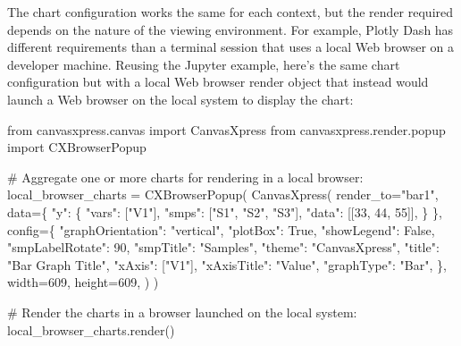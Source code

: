 \documentclass[
  letterpaper,
  DIV=11,
  numbers=noendperiod]{scrartcl}
\newenvironment{Shaded}{\begin{snugshade}}{\end{snugshade}}
\newcommand{\CommentTok}[1]{\textcolor[rgb]{0.37,0.37,0.37}{#1}}
\newcommand{\DecValTok}[1]{\textcolor[rgb]{0.68,0.00,0.00}{#1}}
\newcommand{\ImportTok}[1]{\textcolor[rgb]{0.00,0.46,0.62}{#1}}
\newcommand{\NormalTok}[1]{\textcolor[rgb]{0.00,0.23,0.31}{#1}}
\newcommand{\OperatorTok}[1]{\textcolor[rgb]{0.37,0.37,0.37}{#1}}
\newcommand{\StringTok}[1]{\textcolor[rgb]{0.13,0.47,0.30}{#1}}
\newcommand{\VariableTok}[1]{\textcolor[rgb]{0.07,0.07,0.07}{#1}}
\begin{document}
The chart configuration works the same for each context, but the render
required depends on the nature of the viewing environment. For example,
Plotly Dash has different requirements than a terminal session that uses
a local Web browser on a developer machine. Reusing the Jupyter example,
here's the same chart configuration but with a local Web browser render
object that instead would launch a Web browser on the local system to
display the chart:

\begin{Shaded}
\begin{Highlighting}[]
\ImportTok{from}\NormalTok{ canvasxpress.canvas }\ImportTok{import}\NormalTok{ CanvasXpress}
\ImportTok{from}\NormalTok{ canvasxpress.render.popup }\ImportTok{import}\NormalTok{ CXBrowserPopup}

\CommentTok{\# Aggregate one or more charts for rendering in a local browser:}
\NormalTok{local\_browser\_charts }\OperatorTok{=}\NormalTok{ CXBrowserPopup(}
\NormalTok{    CanvasXpress(}
\NormalTok{        render\_to}\OperatorTok{=}\StringTok{"bar1"}\NormalTok{,}
\NormalTok{        data}\OperatorTok{=}\NormalTok{\{}
            \StringTok{"y"}\NormalTok{: \{}
                \StringTok{"vars"}\NormalTok{: [}\StringTok{"V1"}\NormalTok{],}
                \StringTok{"smps"}\NormalTok{: [}\StringTok{"S1"}\NormalTok{, }\StringTok{"S2"}\NormalTok{, }\StringTok{"S3"}\NormalTok{],}
                \StringTok{"data"}\NormalTok{: [[}\DecValTok{33}\NormalTok{, }\DecValTok{44}\NormalTok{, }\DecValTok{55}\NormalTok{]],}
\NormalTok{            \}}
\NormalTok{        \},}
\NormalTok{        config}\OperatorTok{=}\NormalTok{\{}
            \StringTok{"graphOrientation"}\NormalTok{: }\StringTok{"vertical"}\NormalTok{,}
            \StringTok{"plotBox"}\NormalTok{: }\VariableTok{True}\NormalTok{,}
            \StringTok{"showLegend"}\NormalTok{: }\VariableTok{False}\NormalTok{,}
            \StringTok{"smpLabelRotate"}\NormalTok{: }\DecValTok{90}\NormalTok{,}
            \StringTok{"smpTitle"}\NormalTok{: }\StringTok{"Samples"}\NormalTok{,}
            \StringTok{"theme"}\NormalTok{: }\StringTok{"CanvasXpress"}\NormalTok{,}
            \StringTok{"title"}\NormalTok{: }\StringTok{"Bar Graph Title"}\NormalTok{,}
            \StringTok{"xAxis"}\NormalTok{: [}\StringTok{"V1"}\NormalTok{],}
            \StringTok{"xAxisTitle"}\NormalTok{: }\StringTok{"Value"}\NormalTok{,}
            \StringTok{"graphType"}\NormalTok{: }\StringTok{"Bar"}\NormalTok{,}
\NormalTok{        \},}
\NormalTok{        width}\OperatorTok{=}\DecValTok{609}\NormalTok{,}
\NormalTok{        height}\OperatorTok{=}\DecValTok{609}\NormalTok{,}
\NormalTok{    )   }
\NormalTok{)}

\CommentTok{\# Render the charts in a browser launched on the local system:}
\NormalTok{local\_browser\_charts.render()}
\end{Highlighting}
\end{Shaded}
\end{document}
